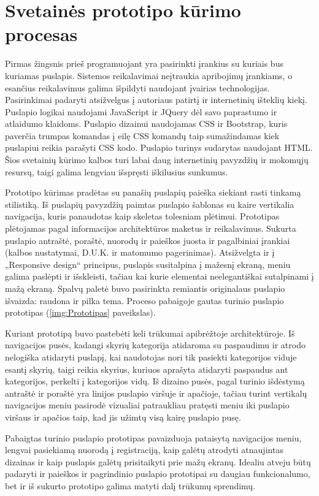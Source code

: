 \documentclass{VUMIFPSbakalaurinis}
\begin{document}
\section{Svetainės prototipo kūrimo procesas}
Pirmas žingsnis prieš programuojant yra pasirinkti įrankius su kuriais bus kuriamas puslapis. Sistemos reikalavimai neįtraukia apribojimų įrankiams, o esančius reikalavimus galima išpildyti naudojant įvairias technologijas. Pasirinkimai padaryti atsižvelgus į autoriaus patirtį ir internetinių išteklių kiekį. Puslapio logikai naudojami JavaScript ir JQuery dėl savo paprastumo ir atlaidumo klaidoms. Puslapio dizainui naudojamas CSS ir Bootstrap, kuris paverčia trumpas komandas į eilę CSS komandų taip sumažindamas kiek puslapiui reikia parašyti CSS kodo. Puslapio turinys sudarytas naudojant HTML. Šios svetainių kūrimo kalbos turi labai daug internetinių pavyzdžių ir mokomųjų resursų, taigi galima lengviau išspręsti iškilusius sunkumus.

Prototipo kūrimas pradėtas su panašių puslapių paieška siekiant rasti tinkamą stilistiką. Iš puslapių pavyzdžių paimtas puslapio šablonas su kaire vertikalia navigacija, kuris panaudotas kaip skeletas tolesniam plėtimui. Prototipas plėtojamas pagal informacijos architektūros maketus ir reikalavimus. Sukurta puslapio antraštė, poraštė, nuorodų ir paieškos juosta ir pagalbiniai įrankiai (kalbos nustatymai, D.U.K. ir matomumo pagerinimas). Atsižvelgta ir į „Responsive design“ principus, puslapis susitalpina į mažesnį ekraną, meniu galima paslėpti ir išskleisti, tačiau kai kurie elementai neelegantiškai sutalpinami į mažą ekraną. Spalvų paletė buvo pasirinkta remiantis originalaus puslapio išvaizda: raudona ir pilka tema. Proceso pabaigoje gautas turinio puslapio prototipas (\ref{img:Prototipas} paveikslas).

Kuriant prototipą buvo pastebėti keli trūkumai apibrėžtoje architektūroje. Iš navigacijos pusės, kadangi skyrių kategorija atidaroma su paspaudimu ir atrodo nelogiška atidaryti puslapį, kai naudotojas nori tik pasiekti kategorijos viduje esantį skyrių, taigi reikia skyrius, kuriuos aprašyta atidaryti paspaudus ant kategorijos, perkelti į kategorijos vidų. Iš dizaino pusės, pagal turinio išdėstymą antraštė ir poraštė yra linijos puslapio viršuje ir apačioje, tačiau turint vertikalų navigacijos meniu pasirodė vizualiai patraukliau pratęsti meniu iki puslapio viršaus ir apačios taip, kad jis užimtų visą kairę puslapio pusę.

Pabaigtas turinio puslapio prototipas pavaizduoja pataisytą navigacijos meniu, lengvai pasiekiamą nuorodą į registraciją, kaip galėtų atrodyti atnaujintas dizainas ir kaip puslapis galėtų prisitaikyti prie mažų ekranų. Idealiu atveju būtų padaryti ir paieškos ir pagrindinio puslapio prototipai su daugiau funkcionalumo, bet ir iš sukurto prototipo galima matyti dalį trūkumų sprendimų.
\end{document}
